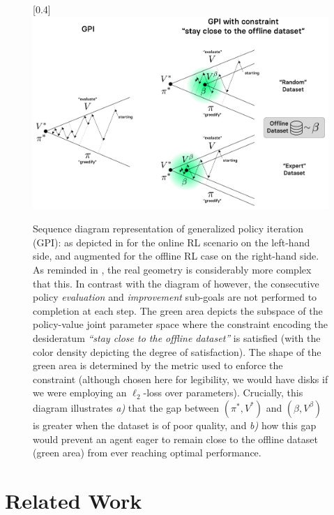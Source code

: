 \begin{figure}[!h]
  \center\scalebox{0.4}[0.4]{\includegraphics{Diags/gpi.pdf}}
  \caption{Sequence diagram representation of generalized policy iteration (GPI):
  as depicted in \cite{Sutton1998-ow} for the online RL scenario on the left-hand side,
  and augmented for the offline RL case on the right-hand side.
  As reminded in \cite{Sutton1998-ow}, the real geometry is considerably more complex that this.
  In contrast with the diagram of \cite{Sutton1998-ow} however,
  the consecutive policy \textit{evaluation} and \textit{improvement}
  sub-goals are not performed to completion at each step.
  The green area depicts the subspace of the policy-value joint parameter space where the constraint
  encoding the desideratum \textit{``stay close to the offline dataset''} is satisfied
  (with the color density depicting the degree of satisfaction).
  The shape of the green area is determined by the metric used to enforce the constraint
  (although chosen here for legibility, we would have disks if we were employing an $\ell_2$-loss over parameters).
  Crucially, this diagram illustrates
  \textit{a)} that the gap between $(\pi^*, V^*)$ and $(\beta, V^\beta)$ is greater when
  the dataset is of poor quality,
  and \textit{b)} how this gap would prevent an agent eager to remain close to the offline dataset (green area)
  from ever reaching optimal performance.}
  \label{gpidiag}
\end{figure}

\section{Related Work}
\label{relatedwork}

